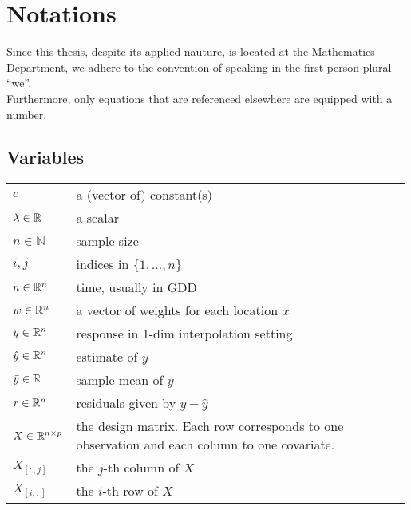\chapter*{\vspace{-3.2cm} Notations}
\label{c:Notation}
\vspace{-0.6cm}
Since this thesis, despite its applied nauture, is located at the Mathematics Department, we adhere to the convention of speaking in the first person plural ``we''.\\
Furthermore, only equations that are referenced elsewhere are equipped with a number.

\section*{Variables}\vspace{-0.2cm}
\renewcommand{\arraystretch}{1.3} %
\begin{longtable}{p{0.12\linewidth} p{0.87\linewidth}}
$c$		& a (vector of) constant(s)\\
$\lambda \in \mathbb{R}$		& a scalar\\
$n\in \mathbb{N}$		& sample size\\
$i,j$		& indices in $\{1,\dots,n\}$\\
$n\in \mathbb{R}^n$		& time, usually in GDD\\
$w \in \mathbb{R}^n$		& a vector of weights for each location $x$\\
$y\in \mathbb{R}^n$		& response in 1-dim interpolation setting\\
$\hat y\in \mathbb{R}^n$		& estimate of $y$\\
$\bar y\in \mathbb{R}$		& sample mean of $y$\\
$r \in \mathbb{R}^n$		& residuals given by $y - \hat y$\\
$X\in\mathbb{R}^{n\times p}$ & the design matrix. Each row corresponds to one observation and each column to one covariate.\\
$X_{[:,j]}$ 	& the $j$-th column of $X$\\
$X_{[i,:]}$ 	& the $i$-th row of $X$
\end{longtable}

